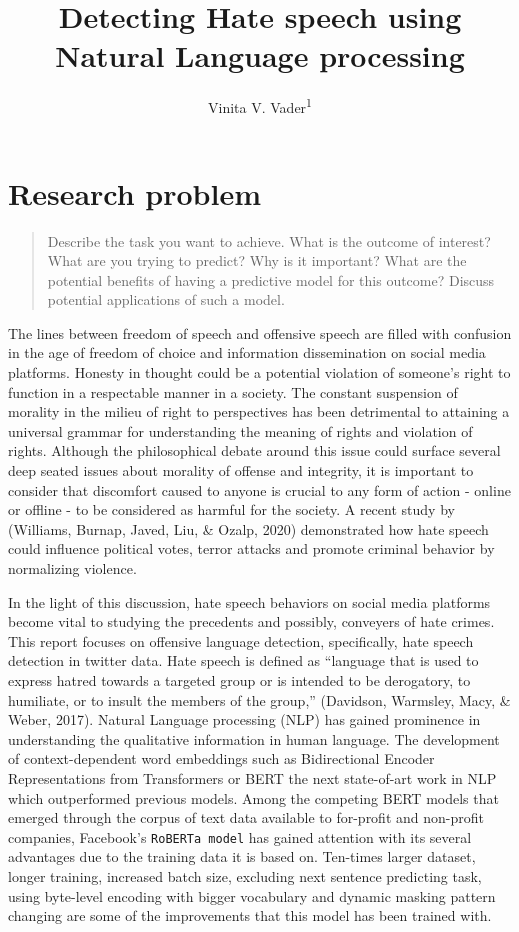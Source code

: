 \documentclass[
  english,
  man]{apa6}
\title{Detecting Hate speech using Natural Language processing}
\author{Vinita V. Vader\textsuperscript{1}}
\date{}
\affiliation{\vspace{0.5cm}\textsuperscript{1} University of Oregon}
\begin{document}
\maketitle

\hypertarget{research-problem}{%
\section{Research problem}\label{research-problem}}

\begin{quote}
Describe the task you want to achieve. What is the outcome of interest? What are you trying to predict? Why is it important? What are the potential benefits of having a predictive model for this outcome? Discuss potential applications of such a model.
\end{quote}

The lines between freedom of speech and offensive speech are filled with confusion in the age of freedom of choice and information dissemination on social media platforms. Honesty in thought could be a potential violation of someone's right to function in a respectable manner in a society. The constant suspension of morality in the milieu of right to perspectives has been detrimental to attaining a universal grammar for understanding the meaning of rights and violation of rights. Although the philosophical debate around this issue could surface several deep seated issues about morality of offense and integrity, it is important to consider that discomfort caused to anyone is crucial to any form of action - online or offline - to be considered as harmful for the society. A recent study by (Williams, Burnap, Javed, Liu, \& Ozalp, 2020) demonstrated how hate speech could influence political votes, terror attacks and promote criminal behavior by normalizing violence.

In the light of this discussion, hate speech behaviors on social media platforms become vital to studying the precedents and possibly, conveyers of hate crimes. This report focuses on offensive language detection, specifically, hate speech detection in twitter data. Hate speech is defined as ``language that is used to express hatred towards a targeted group or is intended to be derogatory, to humiliate, or to insult the members of the group,'' (Davidson, Warmsley, Macy, \& Weber, 2017). Natural Language processing (NLP) has gained prominence in understanding the qualitative information in human language. The development of context-dependent word embeddings such as Bidirectional Encoder Representations from Transformers or BERT the next state-of-art work in NLP which outperformed previous models. Among the competing BERT models that emerged through the corpus of text data available to for-profit and non-profit companies, Facebook's \texttt{RoBERTa\ model} has gained attention with its several advantages due to the training data it is based on. Ten-times larger dataset, longer training, increased batch size, excluding next sentence predicting task, using byte-level encoding with bigger vocabulary and dynamic masking pattern changing are some of the improvements that this model has been trained with.
\end{document}
